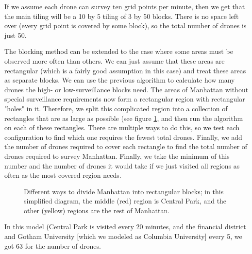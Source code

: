 \documentclass{article}
\begin{document}
If we assume each drone can survey ten grid points per minute, then we get that the main tiling will be a 10 by 5 tiling of 3 by 50 blocks. There is no space left over (every grid point is covered by some block), so the total number of drones is just 50.

The blocking method can be extended to the case where some areas must be observed more often than others. We can just assume that these areas are rectangular (which is a fairly good assumption in this case) and treat these areas as separate blocks. We can use the previous algorithm to calculate how many drones the high- or low-surveillance blocks need. The areas of Manhattan without special surveillance requirements now form a rectangular region with rectangular "holes" in it. Therefore, we split this complicated region into a collection of rectangles that are as large as possible (see figure \ref{blocking2}, and then run the algorithm on each of these rectangles. There are multiple ways to do this, so we test each configuration to find which one requires the fewest total drones. Finally, we add the number of drones required to cover each rectangle to find the total number of drones required to survey Manhattan. Finally, we take the minimum of this number and the number of drones it would take if we just visited all regions as often as the most covered region needs.

\begin{figure}[htb!]
    \caption{Different ways to divide Manhattan into rectangular blocks; in this simplified diagram, the middle (red) region is Central Park, and the other (yellow) regions are the rest of Manhattan.}
    \label{blocking2}
\end{figure}

In this model (Central Park is visited every 20 minutes, and the financial district and Gotham University [which we modeled as Columbia University] every 5, we got 63 for the number of drones.
\end{document}
